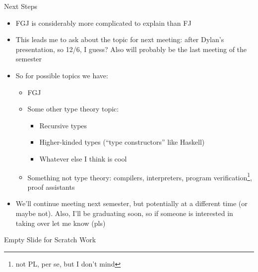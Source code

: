 \documentclass[leqno,presentation,usenames,dvipsnames]{beamer}
\begin{document}
\begin{frame}[fragile]{Next Steps}
    \begin{itemize}
        \item FGJ is considerably more complicated to explain than FJ
        \item This leads me to ask about the topic for next meeting: after Dylan's presentation, so 12/6, I guess? Also will probably be the last meeting of the semester
        \item So for possible topics we have:
            \begin{itemize}
                \item FGJ
                \item Some other type theory topic:
                    \begin{itemize}
                        \item Recursive types
                        \item Higher-kinded types (``type constructors'' like Haskell)
                        \item Whatever else I think is cool
                    \end{itemize}
                \item Something not type theory: compilers, interpreters, program verification\footnote{not PL, per se, but I don't mind}, proof assistants
            \end{itemize}
        \item We'll continue meeting next semester, but potentially at a different time (or maybe not).
            Also, I'll be graduating soon, so if someone is interested in taking over let me know (pls)
    \end{itemize}
\end{frame}

\begin{frame}{Empty Slide for Scratch Work}
\end{frame}
\end{document}
